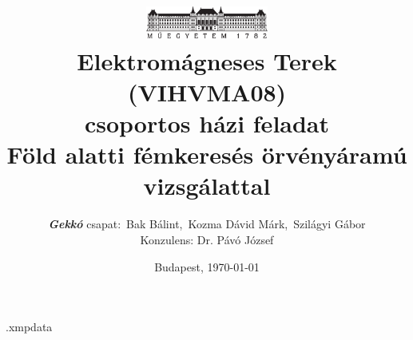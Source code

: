 \begin{filecontents*}[overwrite]{\jobname.xmpdata}
    \Title{}
\end{filecontents*}

\documentclass[a4paper,12pt,oneside]{article}
\usepackage{ucs}
\usepackage[T1]{fontenc}
\usepackage[utf8]{inputenc}
\usepackage[magyar]{babel}
\usepackage{amsfonts}
\usepackage{amsmath,bm}
\usepackage{pdfpages}
\usepackage{amssymb}
\usepackage{graphicx}
\usepackage[hang]{caption}
\usepackage[left=10mm,right=10mm,top=10mm,bottom=10mm]{geometry}
\usepackage{hyperref}
\usepackage[range-phrase=--, range-units=single]{siunitx}
\usepackage{xcolor}
\usepackage[a-3u]{pdfx}

\sloppy %
\def\hyph{-\penalty0\hskip0pt\relax} %

\pagestyle{plain} 
\nopagebreak

\title{
    \centering
    \vspace{-0.8cm}
    \includegraphics[width=0.3\textwidth]{bme_logo.pdf} \\
    \textbf{Elektromágneses Terek (VIHVMA08)\\
    csoportos házi feladat} \\[2ex]
    Föld alatti fémkeresés örvényáramú vizsgálattal
    \vspace{0.1cm}
}


\newcommand\adj[1]{#1^{\mathrm{H}}}

\author{\emph{\textbf{Gekkó}} csapat:~Bak Bálint,~Kozma Dávid Márk,~Szilágyi Gábor \\[2ex]
    Konzulens: Dr. Pávó József}
\date{Budapest, \today}



